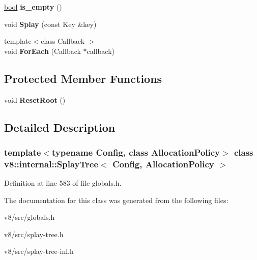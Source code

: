 \begin{DoxyCompactItemize}
\mbox{\hyperlink{classbool}{bool}} {\bfseries is\+\_\+empty} ()
\item 
\mbox{\label{classv8_1_1internal_1_1SplayTree_aea827bdddbd85bf3b188f8b6c9a5a298}} 
void {\bfseries Splay} (const Key \&key)
\item 
\mbox{\label{classv8_1_1internal_1_1SplayTree_a86bc3543b4ba7a00ea043ce4b08d8fae}} 
{\footnotesize template$<$class Callback $>$ }\\void {\bfseries For\+Each} (Callback $\ast$callback)
\end{DoxyCompactItemize}
\subsection*{Protected Member Functions}
\begin{DoxyCompactItemize}
\item 
\mbox{\label{classv8_1_1internal_1_1SplayTree_a2c43926f549f2cc564e6b66fe5fdd040}} 
void {\bfseries Reset\+Root} ()
\end{DoxyCompactItemize}


\subsection{Detailed Description}
\subsubsection*{template$<$typename Config, class Allocation\+Policy$>$\newline
class v8\+::internal\+::\+Splay\+Tree$<$ Config, Allocation\+Policy $>$}



Definition at line 583 of file globals.\+h.



The documentation for this class was generated from the following files\+:\begin{DoxyCompactItemize}
\item 
v8/src/globals.\+h\item 
v8/src/splay-\/tree.\+h\item 
v8/src/splay-\/tree-\/inl.\+h\end{DoxyCompactItemize}
